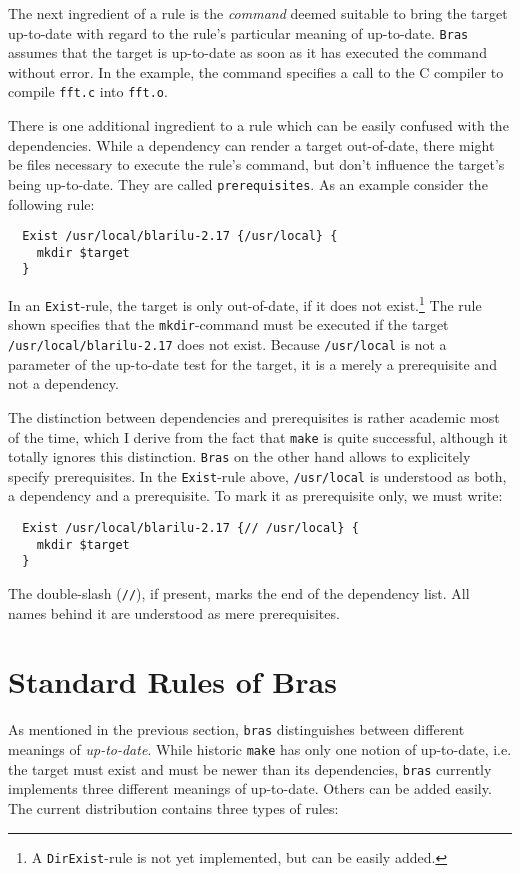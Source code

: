 \documentclass[12pt]{article}
\newcommand{\bras}{\texttt{bras}}
\newcommand{\Bras}{\texttt{Bras}}
\newcommand{\make}{\texttt{make}}
\begin{document}
The next ingredient of a rule is the \textit{command} deemed suitable
to bring the target up-to-date with regard to the rule's particular
meaning of up-to-date. \Bras{} assumes that the target
is up-to-date as soon as it has executed the command without error. In
the example, the command specifies a call to the C compiler to compile
\texttt{fft.c} into \texttt{fft.o}.

There is one additional ingredient to a rule which can be easily
confused with the dependencies. While a dependency can render a target
out-of-date, there might be files necessary to execute the rule's
command, but don't influence the target's being up-to-date.
They are called \texttt{prerequisites}. As an example consider the
following rule:

\begin{verbatim}
  Exist /usr/local/blarilu-2.17 {/usr/local} {
    mkdir $target
  }
\end{verbatim}

In an \texttt{Exist}-rule, the target is only out-of-date, if it does
not exist.\footnote{A \texttt{DirExist}-rule is not yet implemented,
but can be easily added.} The rule shown specifies that the
\texttt{mkdir}-command must be executed if the target
\texttt{/usr/local/blarilu-2.17} does not exist.
Because \texttt{/usr/local} is not a
parameter of the up-to-date test for the target, it is a merely a
prerequisite and not a dependency.

The distinction between dependencies and prerequisites is rather
academic most of the time, which I derive from the fact that \make{}
is quite successful, although it totally ignores this
distinction. \Bras{} on the other hand allows to explicitely specify
prerequisites. In the \texttt{Exist}-rule above, \texttt{/usr/local}
is understood as both, a dependency and a prerequisite. To mark it as
prerequisite only, we must write:

\begin{verbatim}
  Exist /usr/local/blarilu-2.17 {// /usr/local} {
    mkdir $target
  }
\end{verbatim}

The double-slash (\texttt{//}), if present, marks the end of the
dependency list. All names behind it are understood as mere
prerequisites. 

\section{Standard Rules of Bras}
\label{SecStandardRules}
As mentioned in the previous section, \bras{} distinguishes between
different meanings of \textit{up-to-date}. While historic
\make{} has only one notion of up-to-date, i.e. the target must exist
and must be newer than its dependencies, \bras{} currently implements
three different meanings of up-to-date. Others can be added
easily. The current distribution contains three types of rules:
\end{document}
